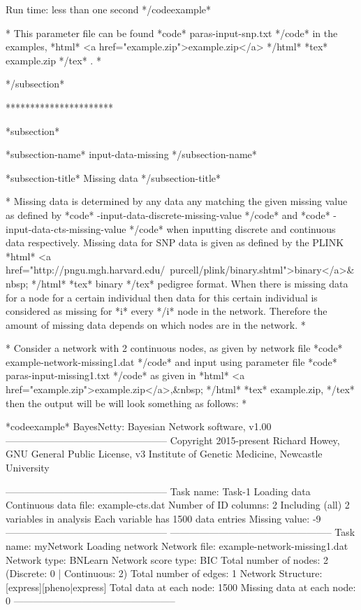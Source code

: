 Run time: less than one second */codeexample*

* This parameter file can be found *code* paras-input-snp.txt */code* in the examples, *html* <a href="example.zip">example.zip</a> */html* *tex* example.zip */tex* . *


*/subsection*

**********************


*subsection*

*subsection-name* input-data-missing */subsection-name*

*subsection-title* Missing data */subsection-title*

* Missing data is determined by any data any matching the given missing value as defined by *code* -input-data-discrete-missing-value */code* and *code* -input-data-cts-missing-value */code* when inputting discrete and continuous data respectively. Missing data for SNP data is given as defined by the PLINK *html* <a href="http://pngu.mgh.harvard.edu/~purcell/plink/binary.shtml">binary</a>&nbsp; */html* *tex* binary */tex* pedigree format. When there is missing data for a node for a certain individual then data for this certain individual is considered as missing for *i* every */i* node in the network. Therefore the amount of missing data depends on which nodes are in the network. *

* Consider a network with 2 continuous nodes, as given by network file *code* example-network-missing1.dat */code* and input using parameter file *code* paras-input-missing1.txt */code* as given in *html* <a href="example.zip">example.zip</a>,&nbsp; */html* *tex* example.zip, */tex* then the output will be will look something as follows: *

*codeexample* BayesNetty: Bayesian Network software, v1.00 -------------------------------------------------- Copyright 2015-present Richard Howey, GNU General Public License, v3 Institute of Genetic Medicine, Newcastle University

-------------------------------------------------- Task name: Task-1 Loading data Continuous data file: example-cts.dat Number of ID columns: 2 Including (all) 2 variables in analysis Each variable has 1500 data entries Missing value: -9 -------------------------------------------------- -------------------------------------------------- Task name: myNetwork Loading network Network file: example-network-missing1.dat Network type: BNLearn Network score type: BIC Total number of nodes: 2 (Discrete: 0 | Continuous: 2) Total number of edges: 1 Network Structure: [express][pheno|express] Total data at each node: 1500 Missing data at each node: 0 --------------------------------------------------

